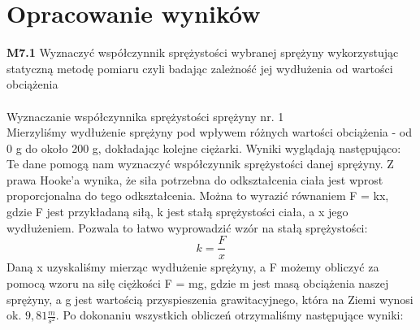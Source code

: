 \documentclass[11pt,a4paper]{article}
\begin{document}
    \section{Opracowanie wyników}
    \textbf{M7.1} Wyznaczyć współczynnik sprężystości wybranej sprężyny wykorzystując
    statyczną metodę pomiaru czyli badając zależność jej wydłużenia od wartości
    obciążenia\\ \\
    Wyznaczanie współczynnika sprężystości sprężyny nr. 1 \\
    Mierzyliśmy wydłużenie sprężyny pod wpływem różnych wartości obciążenia - od 0 g do około 200 g, dokładając kolejne ciężarki. Wyniki wyglądają następująco: \\
    
    Te dane pomogą nam wyznaczyć współczynnik sprężystości danej sprężyny. Z prawa Hooke’a wynika, że siła potrzebna do odkształcenia ciała jest wprost proporcjonalna do tego odkształcenia. Można to wyrazić równaniem F = kx, gdzie F jest przykładaną siłą, k jest stałą sprężystości ciała, a x jego wydłużeniem. Pozwala to łatwo wyprowadzić wzór na stałą sprężystości:
    \[k = \frac{F}{x} \]
        Daną x uzyskaliśmy mierząc wydłużenie sprężyny, a F możemy obliczyć za pomocą wzoru na siłę ciężkości F = mg, gdzie m jest masą obciążenia naszej sprężyny, a g jest wartością przyspieszenia grawitacyjnego, która na Ziemi wynosi ok. $9,81 \frac{m}{s^2}$. Po dokonaniu wszystkich obliczeń otrzymaliśmy następujące wyniki:
    
\end{document}
